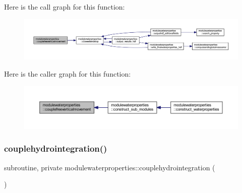 Here is the call graph for this function\+:\nopagebreak
\begin{figure}[H]
\begin{center}
\leavevmode
\includegraphics[width=350pt]{namespacemodulewaterproperties_ab19037aba70755844475216443ec3a35_cgraph}
\end{center}
\end{figure}
Here is the caller graph for this function\+:\nopagebreak
\begin{figure}[H]
\begin{center}
\leavevmode
\includegraphics[width=350pt]{namespacemodulewaterproperties_ab19037aba70755844475216443ec3a35_icgraph}
\end{center}
\end{figure}
\mbox{\label{namespacemodulewaterproperties_a52ab6cc6910ba77bfa6154aca1f67db0}} 
\subsubsection{\texorpdfstring{couplehydrointegration()}{couplehydrointegration()}}
{\footnotesize\ttfamily subroutine, private modulewaterproperties\+::couplehydrointegration (\begin{DoxyParamCaption}{ }\end{DoxyParamCaption})\hspace{0.3cm}{\ttfamily [private]}}

